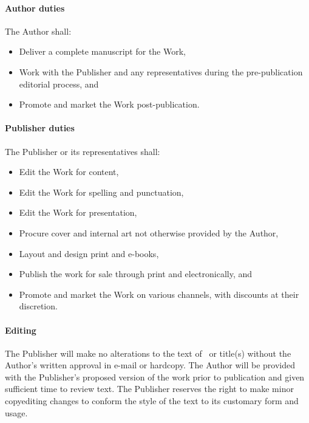 \documentclass[12pt,letterpaper]{article}
\begin{document}
\paragraph{Author duties}

The Author shall:

\begin{itemize}
    \item Deliver a complete manuscript for the Work,
    \item Work with the Publisher and any representatives during the pre-publication editorial process, and
    \item Promote and market the Work post-publication.
\end{itemize}

\paragraph{Publisher duties}

The Publisher or its representatives shall:

\begin{itemize}
    \item Edit the Work for content,
    \item Edit the Work for spelling and punctuation,
    \item Edit the Work for presentation,
    \item Procure cover and internal art not otherwise provided by the Author,
    \item Layout and design print and e-books,
    \item Publish the work for sale through print and electronically, and
    \item Promote and market the Work on various channels, with discounts at their discretion.
\end{itemize}

\paragraph{Editing}

The Publisher will make no alterations to the text of \TheWork\ or title(s) without the Author’s written approval in e-mail or hardcopy. The Author will be provided with the Publisher’s proposed version of the work prior to publication and given sufficient time to review text. The Publisher reserves the right to make minor copyediting changes to conform the style of the text to its customary form and usage.
\end{document}
